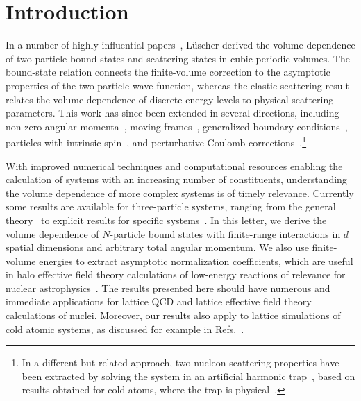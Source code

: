 \documentclass[aps,singlecolumn,superscriptaddress,nofootinbib,tightenlines,
preprintnumbers,showkeys]{revtex4-1}
\begin{document}
\section{Introduction}

In a number of highly influential
papers~\cite{Luscher:1985dn,Luscher:1986pf,Luscher:1990ux}, Lüscher derived 
the volume dependence of two-particle bound states and scattering states in
cubic periodic volumes.  The bound-state relation connects the finite-volume 
correction to the asymptotic properties of the two-particle wave function,
whereas the elastic scattering result relates the volume dependence of discrete 
energy levels to physical scattering parameters.  This work has since been 
extended in several directions, including non-zero angular
momenta~\cite{Luu:2011ep,Konig:2011nz,Konig:2011ti}, moving
frames~\cite{Kim:2005gf,Rummukainen:1995vs,Bour:2011ef,Davoudi:2011md,
Rokash:2013xda}, generalized boundary
conditions~\cite{Sachrajda:2004mi,Briceno:2013hya,Korber:2015rce,
Cherman:2016vpt,Schuetrumpf:2016uuk}, particles with intrinsic
spin~\cite{Briceno:2014oea}, and perturbative Coulomb 
corrections~\cite{Beane:2014qha}.\footnote{In a different but related approach, 
two-nucleon scattering properties have been extracted by solving the system in 
an artificial harmonic trap~\cite{Luu:2010hw}, based on results obtained for 
cold atoms, where the trap is 
physical~\cite{Busch:1997aa,Yip:2008aa,Suzuki:2009aa}.}

With improved numerical techniques and computational resources enabling the
calculation of systems with an increasing number of constituents, understanding 
the volume dependence of more complex systems is of timely relevance.  Currently 
some results are available for three-particle systems, ranging from the general 
theory~\cite{Polejaeva:2012ut,Briceno:2012rv,Briceno:2016ffu} to explicit 
results for specific
systems~\cite{Kreuzer:2010ti,Kreuzer:2012sr,Kreuzer:2013oya,Meissner:2014dea}.  
In this letter, we derive the volume dependence of $N$-particle bound states 
with finite-range interactions in $d$ spatial dimensions and arbitrary total 
angular momentum.  We also use finite-volume energies to extract asymptotic 
normalization coefficients, which are useful in halo effective field theory 
calculations of low-energy reactions of relevance for nuclear 
astrophysics~\cite{Xu:1994zz,Capel:2013zka,Zhang:2014zsa,Hammer:2017tjm}.  The 
results presented here should have numerous and immediate applications for 
lattice QCD and lattice effective field theory calculations of nuclei.
Moreover, our results also apply to lattice simulations of cold atomic systems, 
as discussed for example in Refs.~\cite{Endres:2012cw,Bour:2012hn,Bour:2014bxa}.
\end{document}
